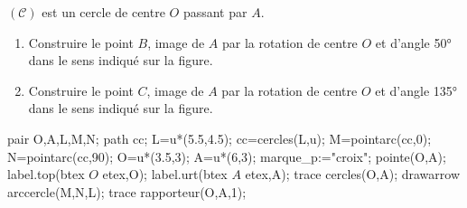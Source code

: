 \begin{exercice*}
    $(\mathcal{C})$ est un cercle de centre $O$ passant par $A$.
    \begin{enumerate}
        \item Construire le point $B$, image de $A$ par la rotation de centre $O$ et d'angle \ang{50} dans le sens indiqué sur la figure.
        \item Construire le point $C$, image de $A$ par la rotation de centre $O$ et d'angle \ang{135} dans le sens indiqué sur la figure.
    \end{enumerate}
    \begin{center}
        \begin{Geometrie}[CoinHD={(7u,6u)}]
            pair O,A,L,M,N;
            path cc;
            L=u*(5.5,4.5);
            cc=cercles(L,u);
            M=pointarc(cc,0);
            N=pointarc(cc,90);
            O=u*(3.5,3);
            A=u*(6,3);
            marque_p:="croix";
            pointe(O,A);
            label.top(btex $O$ etex,O);
            label.urt(btex $A$ etex,A);
            trace cercles(O,A);
            drawarrow arccercle(M,N,L);
            trace rapporteur(O,A,1);
        \end{Geometrie}
    \end{center}
\end{exercice*}
